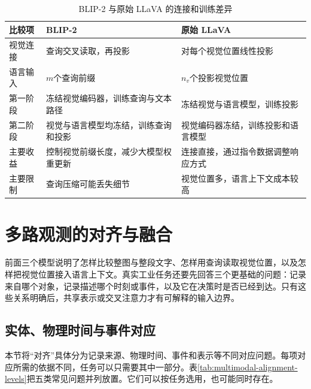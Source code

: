 \begin{table}[htbp]
\centering
\caption{BLIP-2 与原始 LLaVA 的连接和训练差异}
\label{tab:multimodal-interaction}
\small
\setlength{\tabcolsep}{4pt}
\begin{tabular}{@{}>{\raggedright\arraybackslash}m{2.0cm}>{\raggedright\arraybackslash}m{5.1cm}>{\raggedright\arraybackslash}m{5.1cm}@{}}
\toprule
比较项 & BLIP-2 & 原始 LLaVA \\
\midrule
视觉连接 & 查询交叉读取，再投影 & 对每个视觉位置线性投影 \\
语言输入 & $m$个查询前缀 & $n_v$个投影视觉位置 \\
第一阶段 & 冻结视觉编码器，训练查询与文本路径 & 冻结视觉与语言模型，训练投影 \\
第二阶段 & 视觉与语言模型均冻结，训练查询和投影 & 视觉编码器冻结，训练投影和语言模型 \\
主要收益 & 控制视觉前缀长度，减少大模型权重更新 & 连接直接，通过指令数据调整响应方式 \\
主要限制 & 查询压缩可能丢失细节 & 视觉位置多，语言上下文成本较高 \\
\bottomrule
\end{tabular}
\end{table}

\section{多路观测的对齐与融合}
前面三个模型说明了怎样比较整图与整段文字、怎样用查询读取视觉位置，以及怎样把视觉位置接入语言上下文。真实工业任务还要先回答三个更基础的问题：记录来自哪个对象，记录描述哪个时刻或事件，以及它在决策时是否已经到达。只有这些关系明确后，共享表示或交叉注意力才有可解释的输入边界。

\subsection{实体、物理时间与事件对应}
本节将“对齐”具体分为记录来源、物理时间、事件和表示等不同对应问题。每项对应所需的依据不同，任务可以只需要其中一部分。表\ref{tab:multimodal-alignment-levels}把五类常见问题并列放置。它们可以按任务选用，也可能同时存在。

